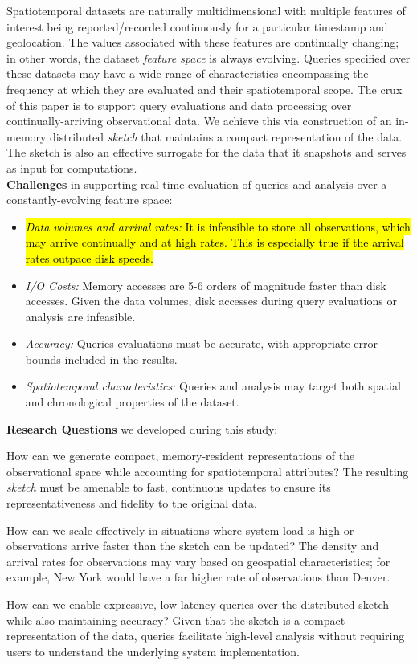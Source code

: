 Spatiotemporal datasets are naturally multidimensional with multiple features of interest being reported/recorded continuously for a particular timestamp and geolocation. The values associated with these features are continually changing; in other words, the dataset \emph{feature space} is always evolving.  Queries specified over these datasets may have a wide range of characteristics encompassing the frequency at which they are evaluated and their spatiotemporal scope. The crux of this paper is to support query evaluations and data processing over continually-arriving observational data. We achieve this via construction of an in-memory distributed \emph{sketch} that maintains a compact representation of the data.
The sketch is also an effective surrogate for the data that it snapshots and serves as input for computations.
%
%
\vspace{1.7em}\\
%
\textbf{Challenges} in supporting real-time evaluation of queries and analysis over a constantly-evolving feature space:
\begin{itemize}[leftmargin=*]
    \item   \hl{\emph{Data volumes and arrival rates:} It is infeasible to store all observations, which may arrive continually and at high rates. This is especially true if the arrival rates outpace disk speeds.}
    \item \emph{I/O Costs:} Memory accesses are 5-6 orders of magnitude faster than disk accesses. Given the data volumes, disk accesses during query evaluations or analysis are infeasible.
    \item   \emph{Accuracy:} Queries evaluations must be accurate, with appropriate error bounds included in the results.
    \item   \emph{Spatiotemporal characteristics:} Queries and analysis may target both spatial and chronological properties of the dataset.
\end{itemize}
%
\vspace{0.7em}
%
\textbf{Research Questions} we developed during this study:
\begin{description}[leftmargin=*]
    \item[\emph{RQ-1:}] How can we generate compact, memory-resident representations of the observational space while accounting for spatiotemporal attributes? The resulting \emph{sketch} must be amenable to fast, continuous updates to ensure its representativeness and fidelity to the original data.
    \item[\emph{RQ-2:}] How can we scale effectively in situations where system load is high or observations arrive faster than the sketch can be updated? The density and arrival rates for observations may vary based on geospatial characteristics; for example, New York would have a far higher rate of observations than Denver.
    \item[\emph{RQ-3:}] How can we enable expressive, low-latency queries over the distributed sketch while also maintaining accuracy?  Given that the sketch is a compact representation of the data, queries facilitate high-level analysis without requiring users to understand the underlying system implementation.
\end{description}
